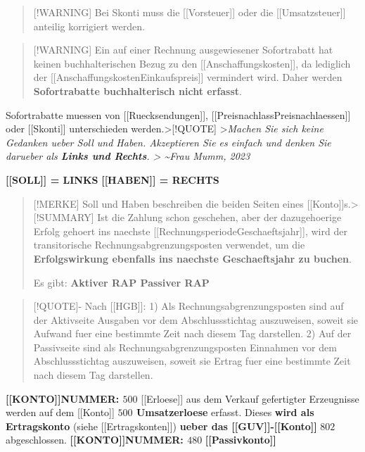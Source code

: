 \begin{quote}
{[}!WARNING{]} Bei Skonti muss die {[}{[}Vorsteuer{]}{]} oder die
{[}{[}Umsatzsteuer{]}{]} anteilig korrigiert werden.
\end{quote}

\begin{quote}
{[}!WARNING{]} Ein auf einer Rechnung ausgewiesener Sofortrabatt hat
keinen buchhalterischen Bezug zu den {[}{[}Anschaffungskosten{]}{]}, da
lediglich der {[}{[}Anschaffungskosten\textbar Einkaufspreis{]}{]}
vermindert wird. Daher werden \textbf{Sofortrabatte buchhalterisch nicht
erfasst}.
\end{quote}

Sofortrabatte muessen von {[}{[}Ruecksendungen{]}{]},
{[}{[}Preisnachlass\textbar Preisnachlaessen{]}{]} oder
{[}{[}Skonti{]}{]} unterschieden werden.\textgreater{[}!QUOTE{]}
\textgreater{}\emph{Machen Sie sich keine Gedanken ueber Soll und Haben.
Akzeptieren Sie es einfach und denken Sie darueber als \textbf{Links und
Rechts}. \textgreater{} \textasciitilde Frau Mumm, 2023}

\textbf{{[}{[}SOLL{]}{]} = LINKS} \textbf{{[}{[}HABEN{]}{]} = RECHTS}

\begin{quote}
{[}!MERKE{]} Soll und Haben beschreiben die beiden Seiten eines
{[}{[}Konto{]}{]}s.\textgreater{[}!SUMMARY{]} Ist die Zahlung schon
geschehen, aber der dazugehoerige Erfolg gehoert ins naechste
{[}{[}Rechnungsperiode\textbar Geschaeftsjahr{]}{]}, wird der
transitorische Rechnungsabgrenzungsposten verwendet, um die
\textbf{Erfolgswirkung ebenfalls ins naechste Geschaeftsjahr zu buchen}.

Es gibt: \textbf{Aktiver RAP Passiver RAP}
\end{quote}

\begin{quote}
{[}!QUOTE{]}- Nach {[}{[}HGB{]}{]}: 1) Als Rechnungsabgrenzungsposten
sind auf der Aktivseite Ausgaben vor dem Abschlussstichtag auszuweisen,
soweit sie Aufwand fuer eine bestimmte Zeit nach diesem Tag darstellen.
2) Auf der Passivseite sind als Rechnungsabgrenzungsposten Einnahmen vor
dem Abschlussstichtag auszuweisen, soweit sie Ertrag fuer eine bestimmte
Zeit nach diesem Tag darstellen.
\end{quote}

\textbf{{[}{[}KONTO{]}{]}NUMMER: \(500\)} {[}{[}Erloese{]}{]} aus dem
Verkauf gefertigter Erzeugnisse werden auf dem {[}{[}Konto{]}{]}
\textbf{\(500\) Umsatzerloese} erfasst. Dieses \textbf{wird als
Ertragskonto} (siehe {[}{[}Ertragskonten{]}{]}) \textbf{ueber das
{[}{[}GUV{]}{]}-{[}{[}Konto{]}{]}} \(802\) abgeschlossen.
\textbf{{[}{[}KONTO{]}{]}NUMMER: \(480\)}
\textbf{{[}{[}Passivkonto{]}{]}}

